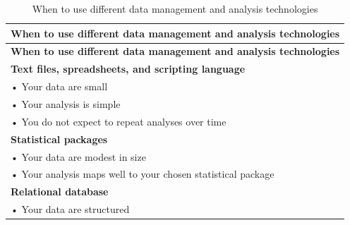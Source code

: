 \documentclass[]{krantz}
\begin{document}
\begin{longtable}[]{@{}l@{}}
\caption{\label{tab:table4-1} When to use different data management and
analysis technologies}\tabularnewline
\toprule
\begin{minipage}[b]{0.89\columnwidth}\raggedright\strut
\textbf{When to use different data management and analysis
technologies}\strut
\end{minipage}\tabularnewline
\midrule
\endfirsthead
\toprule
\begin{minipage}[b]{0.89\columnwidth}\raggedright\strut
\textbf{When to use different data management and analysis
technologies}\strut
\end{minipage}\tabularnewline
\midrule
\endhead
\begin{minipage}[t]{0.89\columnwidth}\raggedright\strut
\textbf{Text files, spreadsheets, and scripting language}\strut
\end{minipage}\tabularnewline
\begin{minipage}[t]{0.89\columnwidth}\raggedright\strut
• Your data are small\strut
\end{minipage}\tabularnewline
\begin{minipage}[t]{0.89\columnwidth}\raggedright\strut
• Your analysis is simple\strut
\end{minipage}\tabularnewline
\begin{minipage}[t]{0.89\columnwidth}\raggedright\strut
• You do not expect to repeat analyses over time\strut
\end{minipage}\tabularnewline
\begin{minipage}[t]{0.89\columnwidth}\raggedright\strut
\textbf{Statistical packages}\strut
\end{minipage}\tabularnewline
\begin{minipage}[t]{0.89\columnwidth}\raggedright\strut
• Your data are modest in size\strut
\end{minipage}\tabularnewline
\begin{minipage}[t]{0.89\columnwidth}\raggedright\strut
• Your analysis maps well to your chosen statistical package\strut
\end{minipage}\tabularnewline
\begin{minipage}[t]{0.89\columnwidth}\raggedright\strut
\textbf{Relational database}\strut
\end{minipage}\tabularnewline
\begin{minipage}[t]{0.89\columnwidth}\raggedright\strut
• Your data are structured\strut
\end{minipage}\tabularnewline

\end{longtable}
\end{document}
